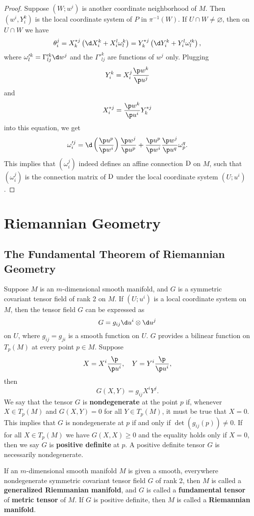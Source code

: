 \documentclass[11pt]{article}
\begin{document}
\begin{proof}
    Suppose $(W; w^i)$ is another coordinate neighborhood of $M$. Then $(w^i, Y^k_i)$ is the local coordinate system of $P$ in $\pi^{-1}(W)$. If $U \cap W \neq \varnothing$, then on $U \cap W$ we have $$\theta^j_i = X^{*j}_k\left(\d X^k_i + X^l_i \omega^k_l\right) = Y^{*j}_k\left(\d Y^k_i + Y^l_i \omega'^k_l\right),$$ where $\omega'^k_l = \Gamma'^k_{lj} \d w^j$ and the $\Gamma'^k_{lj}$ are functions of $w^j$ only. Plugging $$Y^k_i = X^j_i \frac{\p w^k}{\p u^j}$$ and $$X^{*j}_i = \frac{\p w^k}{\p u^i}Y^{*j}_k$$ into this equation, we get $$\omega'^j_i = \d\left(\frac{\p u^p}{\p w^i}\right)\frac{\p w^j}{\p u^p} + \frac{\p u^p}{\p w^i}\frac{\p w^j}{\p u^q}\omega^q_p.$$ This implies that $(\omega^j_i)$ indeed defines an affine connection $\text{D}$ on $M$, such that $(\omega^j_i)$ is the connection matrix of $\text{D}$ under the local coordinate system $(U; u^i)$. 
\end{proof}

\section{Riemannian Geometry}

\subsection{The Fundamental Theorem of Riemannian Geometry}

Suppose $M$ is an $m$-dimensional smooth manifold, and $G$ is a symmetric covariant tensor field of rank 2 on $M$. If $(U; u^i)$ is a local coordinate system on $M$, then the tensor field $G$ can be expressed as $$G = g_{ij}\d u^i \otimes \d u^j$$ on $U$, where $g_{ij} = g_{ji}$ is a smooth function on $U$. $G$ provides a bilinear function on $T_p(M)$ at every point $p \in M$. Suppose $$X = X^i\frac{\p}{\p u^i}, \quad Y = Y^i\frac{\p}{\p u^i},$$ then $$G(X, Y) = g_{ij}X^iY^j.$$ We say that the tensor $G$ is \textbf{nondegenerate} at the point $p$ if, whenever $X \in T_p(M)$ and $G(X, Y) = 0$ for all $Y \in T_p(M)$, it must be true that $X = 0$. This implies that $G$ is nondegenerate at $p$ if and only if $\det(g_{ij}(p)) \neq 0$. If for all $X \in T_p(M)$ we have $G(X, X) \ge 0$ and the equality holds only if $X = 0$, then we say $G$ is \textbf{positive definite} at $p$. A positive definite tensor $G$ is necessarily nondegenerate.

\begin{definition}
    If an $m$-dimensional smooth manifold $M$ is given a smooth, everywhere nondegenerate symmetric covariant tensor field $G$ of rank 2, then $M$ is called a \textbf{generalized Riemmanian manifold}, and $G$ is called a \textbf{fundamental tensor} of \textbf{metric tensor} of $M$. If $G$ is positive definite, then $M$ is called a \textbf{Riemannian manifold}. 
\end{definition}
\end{document}

